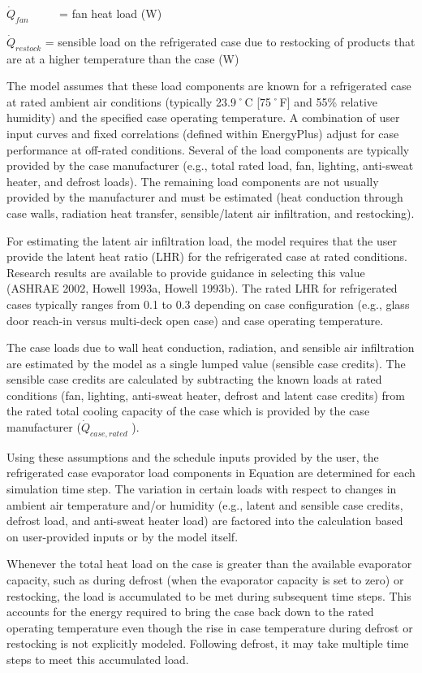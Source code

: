 \({\dot Q_{fan}}\) ~~~~ = fan heat load (W)

\({\dot Q_{restock}}\) = sensible load on the refrigerated case due to restocking of products that are at a higher temperature than the case (W)

The model assumes that these load components are known for a refrigerated case at rated ambient air conditions (typically 23.9˚C {[}75˚F{]} and 55\% relative humidity) and the specified case operating temperature. A combination of user input curves and fixed correlations (defined within EnergyPlus) adjust for case performance at off-rated conditions. Several of the load components are typically provided by the case manufacturer (e.g., total rated load, fan, lighting, anti-sweat heater, and defrost loads). The remaining load components are not usually provided by the manufacturer and must be estimated (heat conduction through case walls, radiation heat transfer, sensible/latent air infiltration, and restocking).

For estimating the latent air infiltration load, the model requires that the user provide the latent heat ratio (LHR) for the refrigerated case at rated conditions. Research results are available to provide guidance in selecting this value (ASHRAE 2002, Howell 1993a, Howell 1993b). The rated LHR for refrigerated cases typically ranges from 0.1 to 0.3 depending on case configuration (e.g., glass door reach-in versus multi-deck open case) and case operating temperature.

The case loads due to wall heat conduction, radiation, and sensible air infiltration are estimated by the model as a single lumped value (sensible case credits). The sensible case credits are calculated by subtracting the known loads at rated conditions (fan, lighting, anti-sweat heater, defrost and latent case credits) from the rated total cooling capacity of the case which is provided by the case manufacturer (\({\dot Q_{case,rated}}\) ).

Using these assumptions and the schedule inputs provided by the user, the refrigerated case evaporator load components in Equation are determined for each simulation time step. The variation in certain loads with respect to changes in ambient air temperature and/or humidity (e.g., latent and sensible case credits, defrost load, and anti-sweat heater load) are factored into the calculation based on user-provided inputs or by the model itself.

Whenever the total heat load on the case is greater than the available evaporator capacity, such as during defrost (when the evaporator capacity is set to zero) or restocking, the load is accumulated to be met during subsequent time steps. This accounts for the energy required to bring the case back down to the rated operating temperature even though the rise in case temperature during defrost or restocking is not explicitly modeled. Following defrost, it may take multiple time steps to meet this accumulated load.

